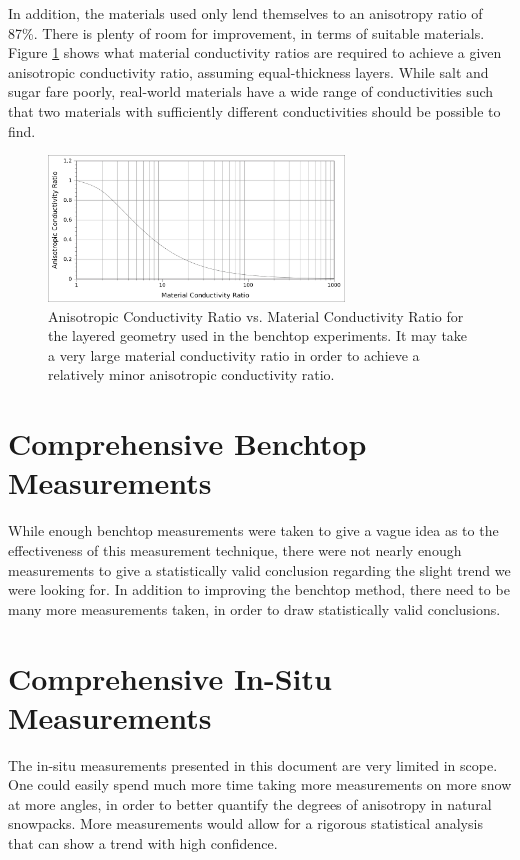 In addition, the materials used only lend themselves to an anisotropy ratio of
87\%. There is plenty of room for improvement, in terms of suitable materials.
Figure \ref{fig:anisovmatl_rats} shows what material conductivity ratios are
required to achieve a given anisotropic conductivity ratio, assuming
equal-thickness layers. While salt and
sugar fare poorly, real-world materials have a wide range of conductivities
such that two materials with sufficiently different conductivities should be
possible to find.

\begin{figure}[h]
\centering
\includegraphics[width=0.7\textwidth]{fig/anisovmaterial_ratios.png}
\caption{Anisotropic Conductivity Ratio vs. Material Conductivity Ratio for the
layered geometry used in the benchtop experiments. It may take a very large
material conductivity ratio in order to achieve a relatively minor anisotropic
conductivity ratio.}
\label{fig:anisovmatl_rats}
\end{figure}

\section{Comprehensive Benchtop Measurements}

While enough benchtop measurements were taken to give a vague idea as to the
effectiveness of this measurement technique, there were not nearly enough
measurements to give a statistically valid conclusion regarding the slight
trend we were looking for. In addition to improving the benchtop method, there
need to be many more measurements taken, in order to draw statistically valid
conclusions.

\section{Comprehensive In-Situ Measurements}

The in-situ measurements presented in this document are very limited in scope.
One could easily spend much more time taking more measurements on more snow at
more angles, in order to better quantify the degrees of anisotropy in natural
snowpacks. More measurements would allow for a rigorous statistical analysis that
can show a trend with high confidence.


